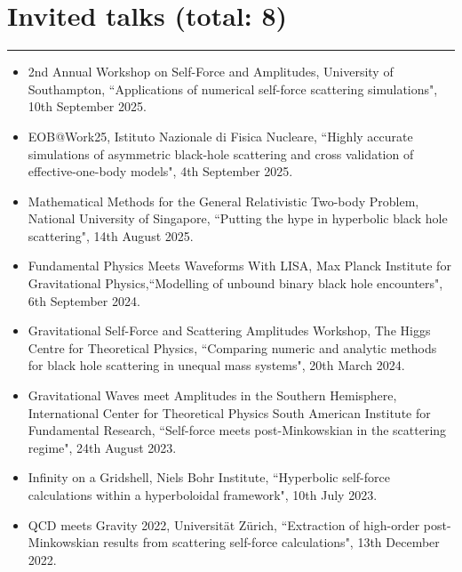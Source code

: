 \documentclass[10.5pt, oneside]{article}   	%
\begin{document}
  {\color{Sectioncolour}
\section*{Invited talks {\rm (total: 8)}}
\vspace{-3mm}
\noindent\rule{\linewidth}{0.6pt}}
\begin{itemize}
\item 2nd Annual Workshop on Self-Force and Amplitudes, University of Southampton, ``Applications of numerical self-force scattering simulations", 10th September 2025.
\item EOB@Work25, Istituto Nazionale di Fisica Nucleare, ``Highly accurate simulations of asymmetric black-hole scattering and cross validation of effective-one-body models", 4th September 2025.
\item Mathematical Methods for the General Relativistic Two-body Problem, National University of Singapore, ``Putting the hype in hyperbolic black hole scattering", 14th August 2025.
\item Fundamental Physics Meets Waveforms With LISA, Max Planck Institute for Gravitational Physics,``Modelling of unbound binary black hole encounters", 6th September 2024.
\newpage
\item Gravitational Self-Force and Scattering Amplitudes Workshop, The Higgs Centre for Theoretical Physics, ``Comparing numeric and analytic methods for black hole scattering in unequal mass systems", 20th March 2024.
\item Gravitational Waves meet Amplitudes in the Southern Hemisphere, International Center for Theoretical Physics South American Institute for Fundamental Research, ``Self-force meets post-Minkowskian in the scattering regime", 24th August 2023.
\item Infinity on a Gridshell, Niels Bohr Institute, ``Hyperbolic self-force calculations within a hyperboloidal framework", 10th July 2023.
\item QCD meets Gravity 2022, Universität Zürich, ``Extraction of high-order post-Minkowskian results from scattering self-force calculations", 13th December 2022.
\end{itemize} 
\end{document}
